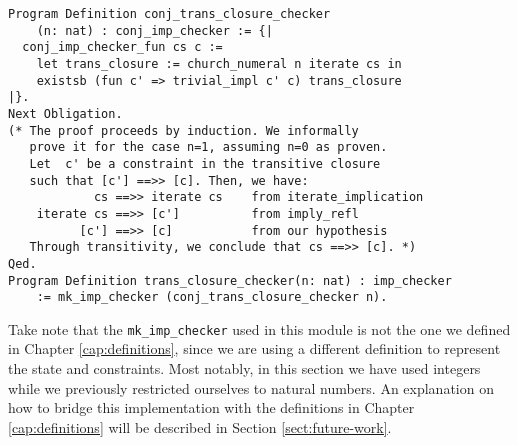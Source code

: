 \begin{verbatim}
Program Definition conj_trans_closure_checker
    (n: nat) : conj_imp_checker := {|
  conj_imp_checker_fun cs c := 
    let trans_closure := church_numeral n iterate cs in 
    existsb (fun c' => trivial_impl c' c) trans_closure
|}.
Next Obligation. 
(* The proof proceeds by induction. We informally
   prove it for the case n=1, assuming n=0 as proven.
   Let  c' be a constraint in the transitive closure
   such that [c'] ==>> [c]. Then, we have:
            cs ==>> iterate cs    from iterate_implication
    iterate cs ==>> [c']          from imply_refl
          [c'] ==>> [c]           from our hypothesis
   Through transitivity, we conclude that cs ==>> [c]. *)
Qed. 
Program Definition trans_closure_checker(n: nat) : imp_checker 
    := mk_imp_checker (conj_trans_closure_checker n).
\end{verbatim}

Take note that the \texttt{mk_imp_checker} used in this module is not
the one we defined in Chapter \ref{cap:definitions}, since we are using a different definition
to represent the state and constraints. Most notably, in this section we have used
integers while we previously restricted ourselves to natural numbers. An explanation
on how to bridge this implementation with the definitions in Chapter \ref{cap:definitions}
will be described in Section \ref{sect:future-work}.